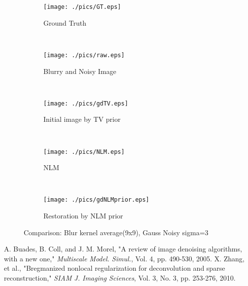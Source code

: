 \documentclass[paper=a4, fontsize=11pt]{scrartcl}
\begin{document}
\begin{figure}[ht]
    \centering
    \begin{subfigure}[b]{0.3\textwidth}
        \texttt{[image: ./pics/GT.eps]}
        \caption{Ground Truth}
    \end{subfigure}
    ~ %
    \begin{subfigure}[b]{0.3\textwidth}
        \texttt{[image: ./pics/raw.eps]}
        \caption{Blurry and Noisy Image}
    \end{subfigure}
    \\
    \begin{subfigure}[b]{0.3\textwidth}
        \texttt{[image: ./pics/gdTV.eps]}
        \caption{Initial image by TV prior}
    \end{subfigure}
    ~
    \begin{subfigure}[b]{0.3\textwidth}
        \texttt{[image: ./pics/NLM.eps]}
        \caption{NLM}
    \end{subfigure}
    ~
    \begin{subfigure}[b]{0.3\textwidth}
        \texttt{[image: ./pics/gdNLMprior.eps]}
        \caption{Restoration by NLM prior}
    \end{subfigure}
    \caption{Comparison: Blur kernel average(9x9), Gauss Noisy sigma=3}
\end{figure}


\begin{thebibliography}{1}
 A. Buades, B. Coll, and J. M. Morel, "A review of image denoising algorithms, with a new one," {\it Multiscale Model. Simul.}, Vol. 4, pp. 490-530, 2005.
 X. Zhang, et al., "Bregmanized nonlocal regularization for deconvolution and sparse reconstruction," {\it SIAM J. Imaging Sciences}, Vol. 3, No. 3, pp. 253-276, 2010.
\end{thebibliography}
\end{document}
